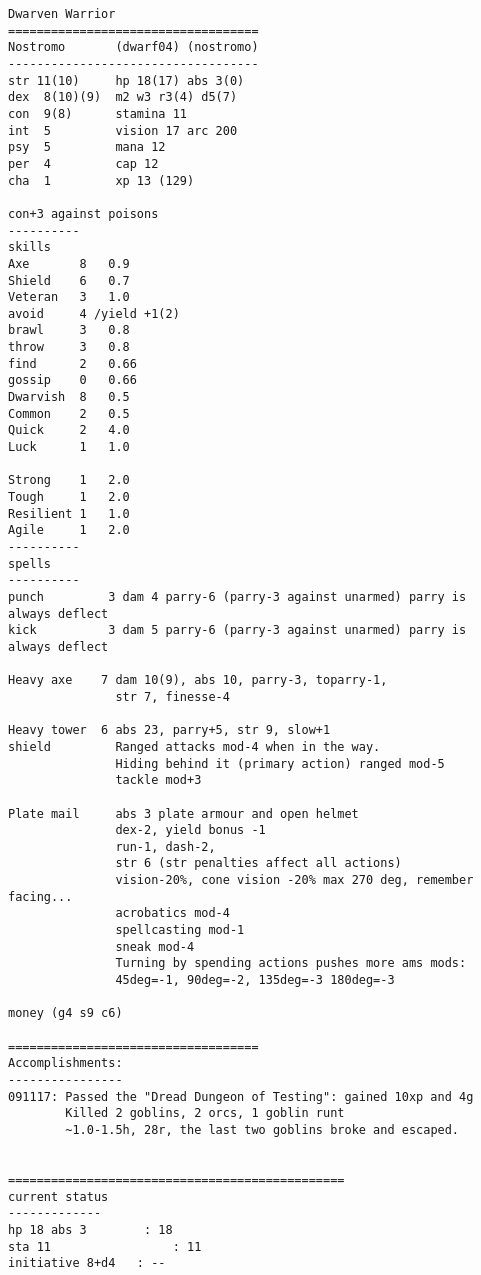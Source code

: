 \goodbreak
\tiny \begin{samepage} \begin{verbatim}
Dwarven Warrior
===================================
Nostromo       (dwarf04) (nostromo)
-----------------------------------
str 11(10)     hp 18(17) abs 3(0)
dex  8(10)(9)  m2 w3 r3(4) d5(7)
con  9(8)      stamina 11
int  5         vision 17 arc 200
psy  5         mana 12
per  4         cap 12
cha  1         xp 13 (129)

con+3 against poisons
----------
skills
Axe       8   0.9
Shield    6   0.7
Veteran   3   1.0
avoid     4 /yield +1(2)
brawl     3   0.8
throw     3   0.8
find      2   0.66
gossip    0   0.66
Dwarvish  8   0.5
Common    2   0.5
Quick     2   4.0
Luck      1   1.0

Strong    1   2.0
Tough     1   2.0
Resilient 1   1.0
Agile     1   2.0
----------
spells
----------
punch         3 dam 4 parry-6 (parry-3 against unarmed) parry is always deflect
kick          3 dam 5 parry-6 (parry-3 against unarmed) parry is always deflect

Heavy axe    7 dam 10(9), abs 10, parry-3, toparry-1,
               str 7, finesse-4

Heavy tower  6 abs 23, parry+5, str 9, slow+1
shield         Ranged attacks mod-4 when in the way.
               Hiding behind it (primary action) ranged mod-5
               tackle mod+3

Plate mail     abs 3 plate armour and open helmet
               dex-2, yield bonus -1
               run-1, dash-2,
               str 6 (str penalties affect all actions)
               vision-20%, cone vision -20% max 270 deg, remember facing...
               acrobatics mod-4
               spellcasting mod-1
               sneak mod-4
               Turning by spending actions pushes more ams mods:
               45deg=-1, 90deg=-2, 135deg=-3 180deg=-3

money (g4 s9 c6)

===================================
Accomplishments:
----------------
091117: Passed the "Dread Dungeon of Testing": gained 10xp and 4g
        Killed 2 goblins, 2 orcs, 1 goblin runt
        ~1.0-1.5h, 28r, the last two goblins broke and escaped.


===============================================
current status
-------------
hp 18 abs 3        : 18
sta 11                 : 11
initiative 8+d4   : --
\end{verbatim} \end{samepage} \normalsize


